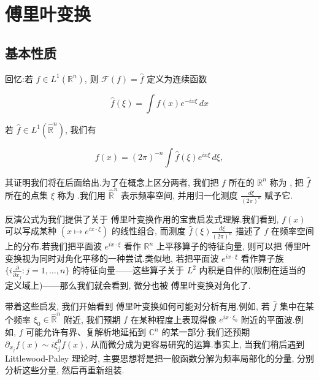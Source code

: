 \chapter{傅里叶变换}

\section{基本性质}

回忆:若 $f \in L^1(\mathbb{R}^n)$, 则  $\mathcal{F}(f) = \hat{f}$ 定义为连续函数

\begin{equation}
\hat{f}(\xi) = \int f(x)e^{-ix\xi}\, dx\label{eq:c5-155}
\end{equation}

若 $\hat{f} \in L^1(\widehat{\mathbb{R}}^n)$, 我们有 

\begin{equation}
f(x) = (2\pi)^{-n}\int\hat{f}(\xi)e^{ix\xi}\, d\xi, \label{eq:c5-156}
\end{equation}

其证明我们将在后面给出.为了在概念上区分两者, 我们把 $f$ 所在的 $\mathbb{R}^n$ 称为 , 把 $\hat{f}$ 所在的点集 $\xi$ 称为 .我们用 $\widehat{\mathbb{R}}^n$ 表示频率空间, 并用归一化测度 $\frac{d\xi}{(2\pi)^n}$ 赋予它.

反演公式为我们提供了关于 傅里叶变换作用的宝贵启发式理解.我们看到, $f(x)$ 可以写成某种  $(x\mapsto e^{ix\cdot\xi})$ 的线性组合, 而测度 $\hat{f}(\xi)\frac{d\xi}{(2\pi)^n}$ 描述了 $f$ 在频率空间上的分布.若我们把平面波 $e^{ix\cdot\xi}$ 看作 $\mathbb{R}^n$ 上平移算子的特征向量, 则可以把 傅里叶变换视为同时对角化平移的一种尝试.类似地, 若把平面波 $e^{ix\cdot\xi}$ 看作算子族 $\{i\frac{\partial}{\partial x_j}: j = 1, \ldots, n\}$ 的特征向量——这些算子关于 $L^2$ 内积是自伴的(限制在适当的定义域上)——那么我们就会看到, 微分也被 傅里叶变换对角化了.

带着这些启发, 我们开始看到 傅里叶变换如何可能对分析有用.例如, 若 $\hat{f}$ 集中在某个频率 $\xi_0 \in \widehat{\mathbb{R}}^n$ 附近, 我们预期 $f$ 在某种程度上表现得像 $e^{ix\cdot\xi_0}$ 附近的平面波.例如, $f$ 可能允许有界、复解析地延拓到 $\mathbb{C}^n$ 的某一部分.我们还预期 $\partial_{x_j}f(x)\sim i\xi_j^0 f(x)$, 从而微分成为更容易研究的运算.事实上, 当我们稍后遇到 Littlewood-Paley 理论时, 主要思想将是把一般函数分解为频率局部化的分量, 分别分析这些分量, 然后再重新组装.

